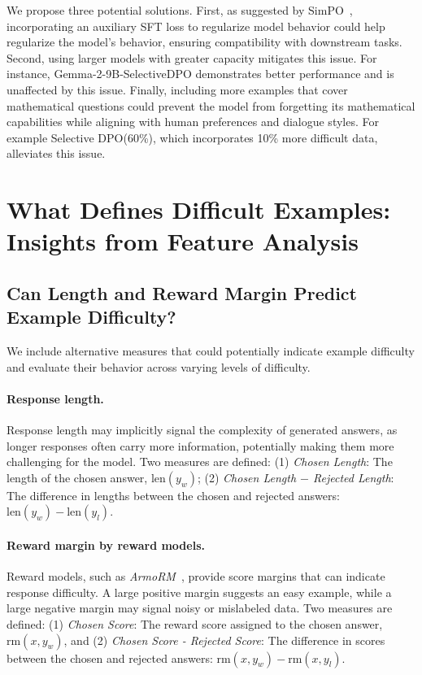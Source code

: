 We propose three potential solutions. First, as suggested by SimPO~\cite{meng2024simpo}, incorporating an auxiliary SFT loss to regularize model behavior could help regularize the model’s behavior, ensuring compatibility with downstream tasks. 
Second, using larger models with greater capacity mitigates this issue. For instance, Gemma-2-9B-SelectiveDPO demonstrates better performance and is unaffected by this issue. 
Finally, including more examples that cover mathematical questions could prevent the model from forgetting its mathematical capabilities while aligning with human preferences and dialogue styles. For example Selective DPO(60\%), which incorporates 10\% more difficult data, alleviates this issue.



\clearpage 
\section{What Defines Difficult Examples: Insights from Feature Analysis}
\label{app:feature-analysis}
\subsection{Can Length and Reward Margin Predict Example Difficulty?}
We include alternative measures that could potentially indicate example difficulty and evaluate their behavior across varying levels of difficulty.

\paragraph{Response length.} 
Response length may implicitly signal the complexity of generated answers, as longer responses often carry more information, potentially making them more challenging for the model. Two measures are defined: (1) \textit{Chosen Length}: The length of the chosen answer, $\text{len}(y_w)$; (2) \textit{Chosen Length $-$ Rejected Length}: The difference in lengths between the chosen and rejected answers: $\text{len}(y_w) - \text{len}(y_l)$. 

\paragraph{Reward margin by reward models.} 
Reward models, such as \textit{ArmoRM}~\cite{wang2024interpretable}, provide score margins that can indicate response difficulty. A large positive margin suggests an easy example, while a large negative margin may signal noisy or mislabeled data. Two measures are defined: (1) \textit{Chosen Score}: The reward score assigned to the chosen answer, $\text{rm}(x, y_w)$, and (2) \textit{Chosen Score - Rejected Score}: The difference in scores between the chosen and rejected answers: $\text{rm}(x, y_w) - \text{rm}(x, y_l)$. 


